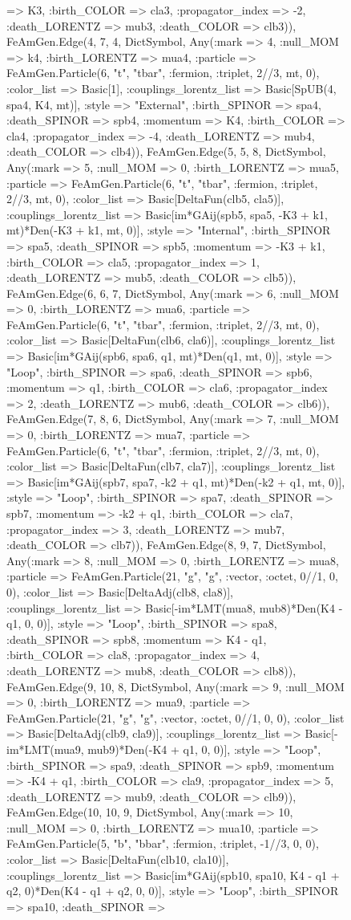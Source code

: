 \documentclass{revtex4}
\begin{document}
\begin{figure}[!htb]
\begin{center}
{=> K3, :birth_COLOR => cla3, :propagator_index => -2, :death_LORENTZ => mub3, :death_COLOR => clb3)), FeAmGen.Edge(4, 7, 4, Dict{Symbol, Any}(:mark => 4, :null_MOM => k4, :birth_LORENTZ => mua4, :particle => FeAmGen.Particle(6, "t", "tbar", :fermion, :triplet, 2//3, mt, 0), :color_list => Basic[1], :couplings_lorentz_list => Basic[SpUB(4, spa4, K4, mt)], :style => "External", :birth_SPINOR => spa4, :death_SPINOR => spb4, :momentum => K4, :birth_COLOR => cla4, :propagator_index => -4, :death_LORENTZ => mub4, :death_COLOR => clb4)), FeAmGen.Edge(5, 5, 8, Dict{Symbol, Any}(:mark => 5, :null_MOM => 0, :birth_LORENTZ => mua5, :particle => FeAmGen.Particle(6, "t", "tbar", :fermion, :triplet, 2//3, mt, 0), :color_list => Basic[DeltaFun(clb5, cla5)], :couplings_lorentz_list => Basic[im*GAij(spb5, spa5, -K3 + k1, mt)*Den(-K3 + k1, mt, 0)], :style => "Internal", :birth_SPINOR => spa5, :death_SPINOR => spb5, :momentum => -K3 + k1, :birth_COLOR => cla5, :propagator_index => 1, :death_LORENTZ => mub5, :death_COLOR => clb5)), FeAmGen.Edge(6, 6, 7, Dict{Symbol, Any}(:mark => 6, :null_MOM => 0, :birth_LORENTZ => mua6, :particle => FeAmGen.Particle(6, "t", "tbar", :fermion, :triplet, 2//3, mt, 0), :color_list => Basic[DeltaFun(clb6, cla6)], :couplings_lorentz_list => Basic[im*GAij(spb6, spa6, q1, mt)*Den(q1, mt, 0)], :style => "Loop", :birth_SPINOR => spa6, :death_SPINOR => spb6, :momentum => q1, :birth_COLOR => cla6, :propagator_index => 2, :death_LORENTZ => mub6, :death_COLOR => clb6)), FeAmGen.Edge(7, 8, 6, Dict{Symbol, Any}(:mark => 7, :null_MOM => 0, :birth_LORENTZ => mua7, :particle => FeAmGen.Particle(6, "t", "tbar", :fermion, :triplet, 2//3, mt, 0), :color_list => Basic[DeltaFun(clb7, cla7)], :couplings_lorentz_list => Basic[im*GAij(spb7, spa7, -k2 + q1, mt)*Den(-k2 + q1, mt, 0)], :style => "Loop", :birth_SPINOR => spa7, :death_SPINOR => spb7, :momentum => -k2 + q1, :birth_COLOR => cla7, :propagator_index => 3, :death_LORENTZ => mub7, :death_COLOR => clb7)), FeAmGen.Edge(8, 9, 7, Dict{Symbol, Any}(:mark => 8, :null_MOM => 0, :birth_LORENTZ => mua8, :particle => FeAmGen.Particle(21, "g", "g", :vector, :octet, 0//1, 0, 0), :color_list => Basic[DeltaAdj(clb8, cla8)], :couplings_lorentz_list => Basic[-im*LMT(mua8, mub8)*Den(K4 - q1, 0, 0)], :style => "Loop", :birth_SPINOR => spa8, :death_SPINOR => spb8, :momentum => K4 - q1, :birth_COLOR => cla8, :propagator_index => 4, :death_LORENTZ => mub8, :death_COLOR => clb8)), FeAmGen.Edge(9, 10, 8, Dict{Symbol, Any}(:mark => 9, :null_MOM => 0, :birth_LORENTZ => mua9, :particle => FeAmGen.Particle(21, "g", "g", :vector, :octet, 0//1, 0, 0), :color_list => Basic[DeltaAdj(clb9, cla9)], :couplings_lorentz_list => Basic[-im*LMT(mua9, mub9)*Den(-K4 + q1, 0, 0)], :style => "Loop", :birth_SPINOR => spa9, :death_SPINOR => spb9, :momentum => -K4 + q1, :birth_COLOR => cla9, :propagator_index => 5, :death_LORENTZ => mub9, :death_COLOR => clb9)), FeAmGen.Edge(10, 10, 9, Dict{Symbol, Any}(:mark => 10, :null_MOM => 0, :birth_LORENTZ => mua10, :particle => FeAmGen.Particle(5, "b", "bbar", :fermion, :triplet, -1//3, 0, 0), :color_list => Basic[DeltaFun(clb10, cla10)], :couplings_lorentz_list => Basic[im*GAij(spb10, spa10, K4 - q1 + q2, 0)*Den(K4 - q1 + q2, 0, 0)], :style => "Loop", :birth_SPINOR => spa10, :death_SPINOR => }
\end{center}
\end{figure}
\end{document}
